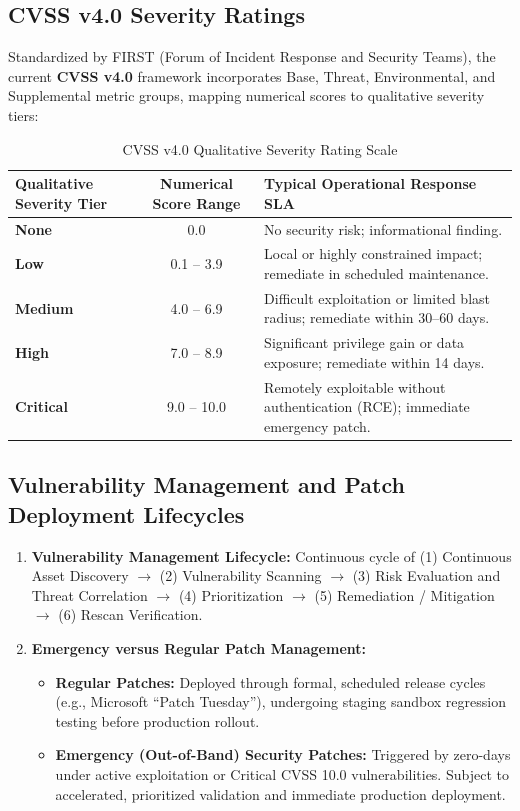 \subsection{CVSS v4.0 Severity Ratings}

Standardized by FIRST (Forum of Incident Response and Security Teams), the current \textbf{CVSS v4.0} framework incorporates Base, Threat, Environmental, and Supplemental metric groups, mapping numerical scores to qualitative severity tiers:

\begin{table}[htbp]
\centering
\caption{CVSS v4.0 Qualitative Severity Rating Scale}
\label{tab:cvss_scale}
\begin{tabularx}{\textwidth}{l c X}
\toprule
\textbf{Qualitative Severity Tier} & \textbf{Numerical Score Range} & \textbf{Typical Operational Response SLA} \\
\midrule
\textbf{None} & 0.0 & No security risk; informational finding. \\
\textbf{Low} & 0.1 -- 3.9 & Local or highly constrained impact; remediate in scheduled maintenance. \\
\textbf{Medium} & 4.0 -- 6.9 & Difficult exploitation or limited blast radius; remediate within 30--60 days. \\
\textbf{High} & 7.0 -- 8.9 & Significant privilege gain or data exposure; remediate within 14 days. \\
\textbf{Critical} & 9.0 -- 10.0 & Remotely exploitable without authentication (RCE); immediate emergency patch. \\
\bottomrule
\end{tabularx}
\end{table}

\subsection{Vulnerability Management and Patch Deployment Lifecycles}

\begin{enumerate}
\item \textbf{Vulnerability Management Lifecycle:} Continuous cycle of (1) Continuous Asset Discovery $\to$ (2) Vulnerability Scanning $\to$ (3) Risk Evaluation and Threat Correlation $\to$ (4) Prioritization $\to$ (5) Remediation / Mitigation $\to$ (6) Rescan Verification.
\item \textbf{Emergency versus Regular Patch Management:}
\begin{itemize}
\item \textbf{Regular Patches:} Deployed through formal, scheduled release cycles (e.g., Microsoft ``Patch Tuesday''), undergoing staging sandbox regression testing before production rollout.
\item \textbf{Emergency (Out-of-Band) Security Patches:} Triggered by zero-days under active exploitation or Critical CVSS 10.0 vulnerabilities. Subject to accelerated, prioritized validation and immediate production deployment.
\end{itemize}
\end{enumerate}

